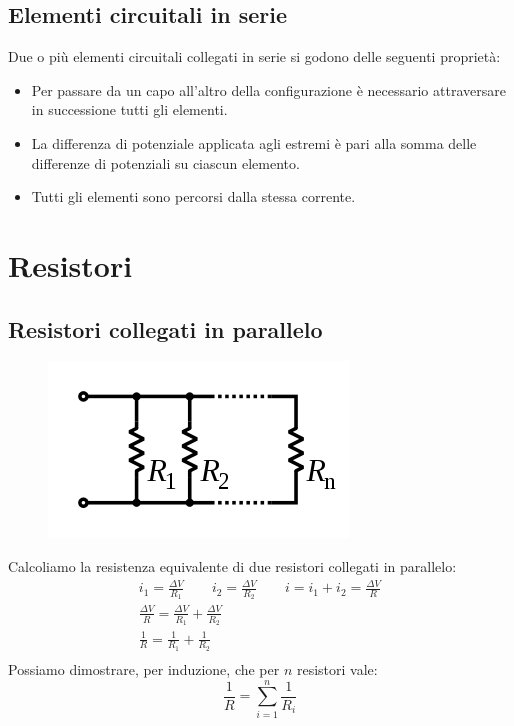 \subsection*{Elementi circuitali in serie}
Due o più elementi circuitali collegati in serie si godono delle seguenti proprietà:
\begin{itemize}
\item{Per passare da un capo all'altro della configurazione è necessario attraversare in successione tutti gli elementi.}
\item{La differenza di potenziale applicata agli estremi è pari alla somma delle differenze di potenziali su ciascun elemento.}
\item{Tutti gli elementi sono percorsi dalla stessa corrente.}
\end{itemize}

\section{Resistori}

\subsection{Resistori collegati in parallelo}
\begin{figure}[h!]
	\centering
    \includegraphics[scale=0.5]{Pictures/resistori-parallelo}
\end{figure}
Calcoliamo la resistenza equivalente di due resistori collegati in parallelo:
\begin{displaymath}\begin{aligned}
	i_1 = \frac{\Delta V}{R_1} \qquad i_2 = \frac{\Delta V}{R_2} \qquad i = i_1 + i_2 = \frac{\Delta V}{R}\\
    \frac{\Delta V}{R} = \frac{\Delta V}{R_1} + \frac{\Delta V}{R_2}\\
    \frac{1}{R} = \frac{1}{R_1} + \frac{1}{R_2}\\
\end{aligned}\end{displaymath}
Possiamo dimostrare, per induzione, che per $n$ resistori vale:
\begin{displaymath}
	\frac{1}{R} = \sum_{i=1}^n \frac{1}{R_i}
\end{displaymath}

